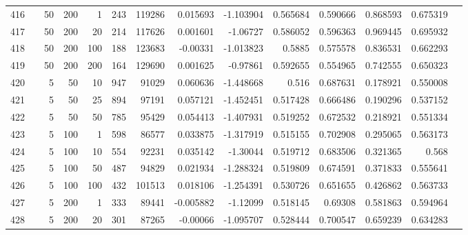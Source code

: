 \begin{longtable}{llrrrrrrrrrrrr}
		416 & &           50 &               200 &            1 &         243 &     119286 &  0.015693 & -1.103904 &  0.565684 &    0.590666 &       0.868593 &  0.675319 \\
		417 & &           50 &               200 &           20 &         214 &     117626 &  0.001601 &  -1.06727 &  0.586052 &    0.596363 &       0.969445 &  0.695932 \\
		418 & &           50 &               200 &          100 &         188 &     123683 &  -0.00331 & -1.013823 &    0.5885 &    0.575578 &       0.836531 &  0.662293 \\
		419 & &           50 &               200 &          200 &         164 &     129690 &  0.001625 &  -0.97861 &  0.592655 &    0.554965 &       0.742555 &  0.650323 \\\midrule
		420 & \multirow[t]{84}{*}{\rotatebox[origin=r]{90}{tfidf-spacy}} &            5 &                50 &           10 &         947 &      91029 &  0.060636 & -1.448668 &     0.516 &    0.687631 &       0.178921 &  0.550008 \\
		421 & &            5 &                50 &           25 &         894 &      97191 &  0.057121 & -1.452451 &  0.517428 &    0.666486 &       0.190296 &  0.537152 \\
		422 & &            5 &                50 &           50 &          785 &      95429 &  0.054413 & -1.407931 &  0.519252 &    0.672532 &       0.218921 &  0.551334 \\
		423 & &            5 &               100 &            1 &          598 &      86577 &  0.033875 & -1.317919 &  0.515155 &    0.702908 &       0.295065 &  0.563173 \\
		424 & &            5 &               100 &           10 &          554 &      92231 &  0.035142 &  -1.30044 &  0.519712 &    0.683506 &       0.321365 &     0.568 \\
		425 & &            5 &               100 &           50 &          487 &      94829 &  0.021934 & -1.288324 &  0.519809 &    0.674591 &       0.371833 &  0.555641 \\
		426 & &            5 &               100 &          100 &          432 &     101513 &  0.018106 & -1.254391 &  0.530726 &    0.651655 &       0.426862 &  0.563733 \\
		427 & &            5 &               200 &            1 &          333 &      89441 & -0.005882 &  -1.12099 &  0.518145 &     0.69308 &       0.581863 &  0.594964 \\
		428 & &            5 &               200 &           20 &          301 &      87265 &  -0.00066 & -1.095707 &  0.528444 &    0.700547 &       0.659239 &  0.634283 \\

\end{longtable}
